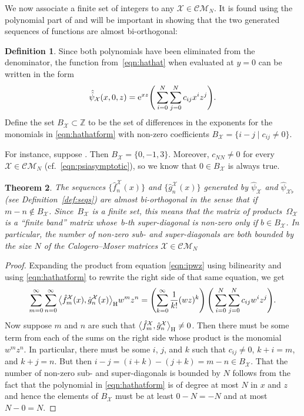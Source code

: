 \documentclass[10pt,a4paper]{amsart}
\numberwithin{equation}{section}
\newtheorem{Theorem}{Theorem}[section]
\theoremstyle{definition}
\newtheorem{Definition}[Theorem]{Definition}
\def\X{\mathcal{X}}
\def\CM{\mathcal{C\!M}}
\def\ff{\hat f}
\def\gg{\hat g}
\begin{document}
We now associate a finite set of integers to any $\X\in\CM_{N}$. It
is found using the polynomial part of
\smash{$\hat{\hat\psi}_{\X}(x,0,z)$} and will be important in showing that the two
generated sequences of functions are almost bi-orthogonal:
\begin{Definition}\label{def:BX}
Since both polynomials have been eliminated from the denominator, the
function \smash{$\hat{\hat\psi}_{\X}$} from~\eqref{eqn:hathat} when evaluated at $y=0$ can be
written in the form
\begin{equation}
 \hat{\hat\psi}_{\X}(x,0,z)=
{\rm e}^{xz}\Bigg(\sum_{i=0}^N\sum_{j=0}^N c_{ij}x^iz^j\Bigg).\label{eqn:hathatform}
\end{equation}
 Define the set $B_{\X}\subset\mathbb{Z}$ to be the set of
 differences in the exponents for the monomials in
 \eqref{eqn:hathatform} with non-zero coefficients
$ B_{\X}=\{i-j\mid c_{ij}\not=0\}$.
\end{Definition}

For instance, suppose
\smash{$\hat{\hat\psi}_{\X}(x,0,z)={\rm e}^{xz}\bigl(1+xz^2+x^3\bigr)$}. Then
$B_{\X}=\{0,-1,3\}$. Moreover, $c_{NN}\not=0$ for every $\X\in\CM_N$
(cf.\ \eqref{eqn:psiasymptotic}), so we know that $0\in B_{\X}$
is always true.

\begin{Theorem}\label{thm:almostbiorthog}
The sequences $\big\{\ff_n^{\X}(x)\big\}$ and $\big\{\gg_n^{\X}(x)\big\}$ generated by
$\hat\psi_{\X}$ and $\hat\psi_{\X\flat}$
{\rm(}see Definition~{\rm\ref{def:seqs})} are almost bi-orthogonal in the sense that
\smash{$\big\langle \ff_m^{\X},\gg_n^{\X}\big\rangle_{\rm H}=0$} if $m-n\not\in B_{\X}$. Since~$B_{\X}$ is
a finite set, this means that the matrix of products~$\Omega_{\X}$ is a ``finite band'' matrix whose~$b$\nobreakdash-th super-diagonal is non-zero only if $b\in B_{\X}$. In
particular, the number of non-zero sub- and super-diagonals are both
bounded by the size $N$ of the Calogero--Moser matrices $\X\in\CM_N$
\end{Theorem}
\begin{proof}
Expanding the product from equation \eqref{eqn:ipwz} using bilinearity
and using \eqref{eqn:hathatform} to rewrite the right side of that
same equation, we get
\[
\sum_{m=0}^{\infty}\sum_{n=0}^{\infty}\big\langle
\ff_m^{\X}(x), \gg_n^{\X}(x)\big\rangle_{\rm H} w^mz^n
=
\left(\sum_{k=0}^{\infty}\frac{1}{k!}(wz)^k\right)\Bigg(\sum_{i=0}^N\sum_{j=0}^N c_{ij}w^iz^j\Bigg).
\]
Now suppose $m$ and $n$ are such that $\big\langle
\ff_m^{\X},\gg_n^{\X}\big\rangle_{\rm H}\not=0$. Then there must be some term from
each of the sums on the right side whose product is the monomial
$w^mz^n$. In particular, there must be some $i$, $j$, and $k$ such
that $c_{ij}\not=0$, $k+i=m$, and $k+j=n$. But then
$i-j=(i+k)-(j+k)=m-n\in B_{\X}$.
That the number of non-zero sub- and super-diagonals is bounded by $N$
follows from the fact that the polynomial in \eqref{eqn:hathatform} is
of degree at most $N$ in $x$ and $z$ and hence the elements of
$B_{\X}$ must be at least $0-N=-N$ and at most $N-0=N$.
 \end{proof}
\end{document}
